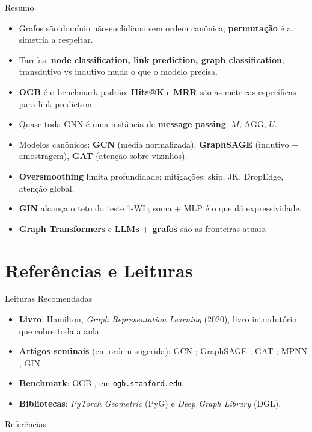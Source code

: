 \documentclass[aspectratio=169,xcolor=dvipsnames]{beamer}
\begin{document}
  \begin{frame}{Resumo}
    \begin{itemize}
      \item Grafos são domínio não-euclidiano sem ordem canônica; \textbf{permutação}
            é a simetria a respeitar.
      \item Tarefas: \textbf{node classification, link prediction, graph classification}; transdutivo vs
            indutivo muda o que o modelo precisa.
      \item \textbf{OGB} é o benchmark padrão; \textbf{Hits@K} e \textbf{MRR} são
            as métricas específicas para link prediction.
      \item Quase toda GNN é uma instância de \textbf{message passing}: $M$,
            $\mathrm{AGG}$, $U$.
      \item Modelos canônicos: \textbf{GCN} (média normalizada), \textbf{GraphSAGE}
            (indutivo $+$ amostragem), \textbf{GAT} (atenção sobre vizinhos).
      \item \textbf{Oversmoothing} limita profundidade; mitigações: skip,
            JK, DropEdge, atenção global.
      \item \textbf{GIN} alcança o teto do teste 1-WL; soma $+$ MLP é o que dá
            expressividade.
      \item \textbf{Graph Transformers} e \textbf{LLMs $+$ grafos} são as
            fronteiras atuais.
    \end{itemize}
  \end{frame}

  \section*{Referências e Leituras}

  \begin{frame}{Leituras Recomendadas}
    \leiturasize
    \begin{itemize}
      \item \textbf{Livro}: Hamilton, \textit{Graph Representation Learning}
            (2020), livro introdutório que cobre toda a aula.
      \item \textbf{Artigos seminais} (em ordem sugerida): GCN
            ; GraphSAGE
            ; GAT
            ; MPNN
            ; GIN
            .
      \item \textbf{Benchmark}: OGB , em
            \texttt{ogb.stanford.edu}.
      \item \textbf{Bibliotecas}: \textit{PyTorch Geometric} (PyG) e
            \textit{Deep Graph Library} (DGL).
    \end{itemize}
  \end{frame}

  \begin{frame}[allowframebreaks]{Referências}
    \sloppy
    \printbibliography[heading=none]
  \end{frame}
\end{document}
